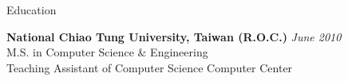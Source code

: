 \documentclass{resume} %
\begin{document}

\begin{rSection}{Education}

{\bf National Chiao Tung University, Taiwan (R.O.C.)} \hfill {\em June 2010} \\ 
M.S. in Computer Science \& Engineering \\
Teaching Assistant of Computer Science Computer Center \\

\end{rSection}

\end{document}
